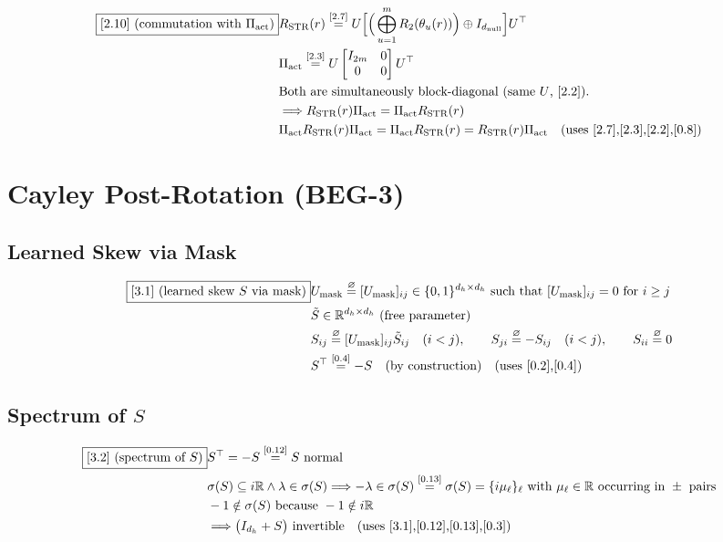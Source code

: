 \documentclass[11pt]{article}
\newcommand{\eqdef}{\overset{\varnothing}{=}}
\newcommand{\eqref}[1]{\overset{[#1]}{=}}
\begin{document}
\begin{align}
\boxed{[2.10] \text{ (commutation with }\Pi_{\mathrm{act}}\text{)}}
&R_{\mathrm{STR}}(r)
\eqref{2.7}
U
\Big[
\Big(
\bigoplus_{u=1}^{m}
R_2(\theta_u(r))
\Big)
\oplus
I_{d_{\mathrm{null}}}
\Big]
U^\top \notag\\
&\Pi_{\mathrm{act}}
\eqref{2.3}
U
\begin{bmatrix}
I_{2m} & 0\\
0 & 0
\end{bmatrix}
U^\top \notag\\
&\text{Both are simultaneously block-diagonal (same }U\text{, [2.2]).} \notag\\
&\Longrightarrow
R_{\mathrm{STR}}(r)\Pi_{\mathrm{act}}
=
\Pi_{\mathrm{act}}R_{\mathrm{STR}}(r) \notag\\
&\Pi_{\mathrm{act}}R_{\mathrm{STR}}(r)\Pi_{\mathrm{act}}
=
\Pi_{\mathrm{act}}R_{\mathrm{STR}}(r)
=
R_{\mathrm{STR}}(r)\Pi_{\mathrm{act}}
\quad(\text{uses [2.7],[2.3],[2.2],[0.8]})
\end{align}

\section{Cayley Post-Rotation (BEG-3)}

\subsection{Learned Skew via Mask}

\begin{align}
\boxed{[3.1] \text{ (learned skew }S\text{ via mask)}}
&U_{\mathrm{mask}}
\eqdef
[U_{\mathrm{mask}}]_{ij}
\in\{0,1\}^{d_h\times d_h}
\text{ such that }
[U_{\mathrm{mask}}]_{ij}=0
\text{ for }i\ge j \notag\\
&\tilde{S}
\in
\mathbb{R}^{d_h\times d_h}
\text{ (free parameter)} \notag\\
&S_{ij}
\eqdef
[U_{\mathrm{mask}}]_{ij}
\tilde{S}_{ij}
\quad(i<j),
\qquad
S_{ji}
\eqdef
-S_{ij}
\quad(i<j),
\qquad
S_{ii}
\eqdef
0 \notag\\
&S^\top
\eqref{0.4}
-S
\quad(\text{by construction})
\quad(\text{uses [0.2],[0.4]})
\end{align}

\subsection{Spectrum of $S$}

\begin{align}
\boxed{[3.2] \text{ (spectrum of }S\text{)}}
&S^\top
=
-S
\eqref{0.12}
S
\text{ normal} \notag\\
&\sigma(S)
\subseteq
i\mathbb{R}
\wedge
\lambda\in\sigma(S)
\Longrightarrow
-\lambda\in\sigma(S)
\eqref{0.13}
\sigma(S)
=
\{i\mu_\ell\}_\ell
\text{ with }\mu_\ell\in\mathbb{R}
\text{ occurring in }\pm\text{ pairs} \notag\\
&-1
\notin
\sigma(S)
\text{ because }
-1
\notin
i\mathbb{R} \notag\\
&\Longrightarrow
\big(I_{d_h}+S\big)
\text{ invertible}
\quad(\text{uses [3.1],[0.12],[0.13],[0.3]})
\end{align}
\end{document}
